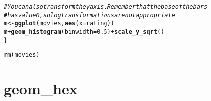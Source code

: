 \documentclass[a4paper,titlepage]{tufte-handout}\usepackage[]{graphicx}\usepackage[]{color}
\makeatletter
\newcommand{\hlnum}[1]{\textcolor[rgb]{0.686,0.059,0.569}{#1}}%
\newcommand{\hlcom}[1]{\textcolor[rgb]{0.678,0.584,0.686}{\textit{#1}}}%
\newcommand{\hlopt}[1]{\textcolor[rgb]{0,0,0}{#1}}%
\newcommand{\hlstd}[1]{\textcolor[rgb]{0.345,0.345,0.345}{#1}}%
\newcommand{\hlkwb}[1]{\textcolor[rgb]{0.69,0.353,0.396}{#1}}%
\newcommand{\hlkwc}[1]{\textcolor[rgb]{0.333,0.667,0.333}{#1}}%
\newcommand{\hlkwd}[1]{\textcolor[rgb]{0.737,0.353,0.396}{\textbf{#1}}}%
\newenvironment{kframe}{%
 \def\at@end@of@kframe{}%
 \ifinner\ifhmode%
  \def\at@end@of@kframe{\end{minipage}}%
  \begin{minipage}{\columnwidth}%
 \fi\fi%
 \def\FrameCommand##1{\hskip\@totalleftmargin \hskip-\fboxsep
 \colorbox{shadecolor}{##1}\hskip-\fboxsep
     \hskip-\linewidth \hskip-\@totalleftmargin \hskip\columnwidth}%
 \MakeFramed {\advance\hsize-\width
   \@totalleftmargin\z@ \linewidth\hsize
   \@setminipage}}%
 {\par\unskip\endMakeFramed%
 \at@end@of@kframe}
\newenvironment{knitrout}{}{} %
\makeatother
\begin{document}
\begin{knitrout}
\begin{kframe}
\begin{alltt}
\hlcom{# You can also transform the y axis.  Remember that the base of the bars}
\hlcom{# has value 0, so log transformations are not appropriate}
\hlstd{m} \hlkwb{<-} \hlkwd{ggplot}\hlstd{(movies,} \hlkwd{aes}\hlstd{(}\hlkwc{x} \hlstd{= rating))}
\hlstd{m} \hlopt{+} \hlkwd{geom_histogram}\hlstd{(}\hlkwc{binwidth} \hlstd{=} \hlnum{0.5}\hlstd{)} \hlopt{+} \hlkwd{scale_y_sqrt}\hlstd{()}
\hlstd{\}}
\end{alltt}


{\ttfamily\noindent\itshape\color{messagecolor}{\#\# Loading required package: ggplot2movies}}

{\ttfamily\noindent\color{warningcolor}{\#\# Warning in library(package, lib.loc = lib.loc, character.only = TRUE, logical.return = TRUE, : there is no package called 'ggplot2movies'}}\begin{alltt}
\hlkwd{rm}\hlstd{(movies)}
\end{alltt}


{\ttfamily\noindent\color{warningcolor}{\#\# Warning in rm(movies): object 'movies' not found}}\end{kframe}
\end{knitrout}


\section{geom\_hex}
\end{document}
